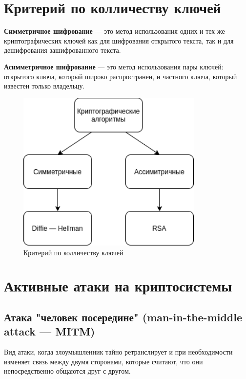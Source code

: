    

   	\newpage
   	
   	\section{Критерий по колличеству ключей}
   	
   	\textbf{Симметричное шифрование} --- это метод использования одних и тех же криптографических ключей как для шифрования открытого текста, так и для дешифрования зашифрованного текста.
   	
   	\textbf{Асимметричное шифрование} --- это метод использования пары ключей: открытого ключа, который широко распространен, и частного ключа, который известен только владельцу.
   	
   	 \begin{figure}[h!]
   		\centering
   		\includegraphics[width=\textwidth,height=8cm,keepaspectratio]{keys.png}
   		\caption{Критерий по колличеству ключей} \label{fig:keys}
   	\end{figure}
        
    \section{Активные атаки на криптосистемы}
    
    \subsection{Атака "человек посередине" (man-in-the-middle attack --- MITM)}
    
    Вид атаки, когда злоумышленник тайно ретранслирует и при необходимости изменяет связь между двумя сторонами, которые считают, что они непосредственно общаются друг с другом.
    
